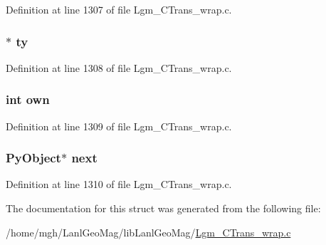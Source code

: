 Definition at line 1307 of file Lgm\_\-CTrans\_\-wrap.c.\hypertarget{struct_py_swig_object_6b6270e5da3083fb1e9476b22a0611ad}{
\subsubsection[{ty}]{$\ast$ {\bf ty}}}
\label{struct_py_swig_object_6b6270e5da3083fb1e9476b22a0611ad}




Definition at line 1308 of file Lgm\_\-CTrans\_\-wrap.c.\hypertarget{struct_py_swig_object_4047a08438f6fec73854d5e936100de0}{
\subsubsection[{own}]{\setlength{\rightskip}{0pt plus 5cm}int {\bf own}}}
\label{struct_py_swig_object_4047a08438f6fec73854d5e936100de0}




Definition at line 1309 of file Lgm\_\-CTrans\_\-wrap.c.\hypertarget{struct_py_swig_object_6ff221eaf6fa7553a0d69c6caad8c815}{
\subsubsection[{next}]{\setlength{\rightskip}{0pt plus 5cm}PyObject$\ast$ {\bf next}}}
\label{struct_py_swig_object_6ff221eaf6fa7553a0d69c6caad8c815}




Definition at line 1310 of file Lgm\_\-CTrans\_\-wrap.c.

The documentation for this struct was generated from the following file:\begin{CompactItemize}
\item 
/home/mgh/LanlGeoMag/libLanlGeoMag/\hyperlink{_lgm___c_trans__wrap_8c}{Lgm\_\-CTrans\_\-wrap.c}\end{CompactItemize}
